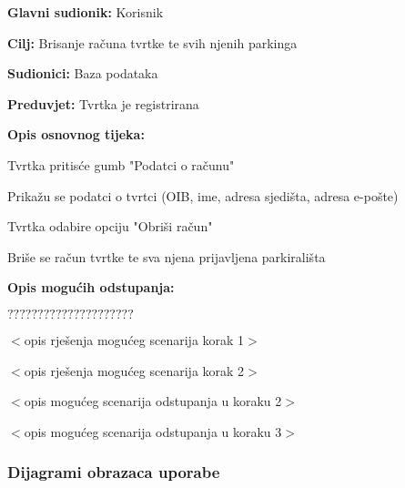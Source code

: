 \noindent {}
\begin{packed_item}
	
	\item \textbf{Glavni sudionik: }Korisnik
	\item  \textbf{Cilj:} Brisanje računa tvrtke te svih njenih parkinga
	\item  \textbf{Sudionici:} Baza podataka
	\item  \textbf{Preduvjet:} Tvrtka je registrirana
	\item  \textbf{Opis osnovnog tijeka:}
	
	\item[] \begin{packed_enum}
		
		\item Tvrtka pritisće gumb "Podatci o računu"
		\item Prikažu se podatci o tvrtci (OIB, ime, adresa sjedišta, adresa e-pošte)
		\item Tvrtka odabire opciju "Obriši račun"
		\item Briše se račun tvrtke te sva njena prijavljena parkirališta
	\end{packed_enum}
	
	\item  \textbf{Opis mogućih odstupanja:}
	
	\item[] \begin{packed_item}
		
		\item[2.a] $?????????????????????$
		\item[] \begin{packed_enum}
			
			\item $<$opis rješenja mogućeg scenarija korak 1$>$
			\item $<$opis rješenja mogućeg scenarija korak 2$>$
			
		\end{packed_enum}
		\item[2.b] $<$opis mogućeg scenarija odstupanja u koraku 2$>$
		\item[3.a] $<$opis mogućeg scenarija odstupanja  u koraku 3$>$
		
	\end{packed_item}
\end{packed_item}

\subsubsection{Dijagrami obrazaca uporabe}

